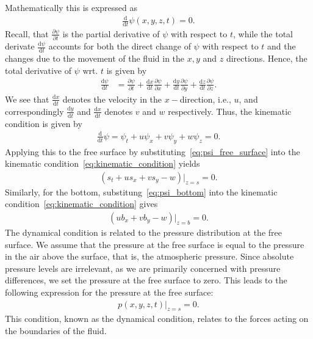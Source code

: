 Mathematically this is expressed as
\begin{align*}
    \frac{\text{d} }{\text{d} t} \psi(x,y,z,t) = 0.
\end{align*}
Recall, that $\frac{\partial \psi}{\partial t}$ is the partial derivative of $\psi$ with respect to $t$, while the total derivate $\frac{\text{d} \psi}{\text{d} t}$ accounts for both the direct change of $\psi$ with respect to $t$ and the changes due to the movement of the fluid in the $x, y$ and $z$ directions.
Hence, the total derivative of $\psi$ wrt. $t$ is given by
\begin{align*}
    \frac{\text{d} \psi}{\text{d} t} &= \frac{\partial \psi}{\partial t} + \frac{\text{d} x}{\text{d} t} \frac{\partial \psi}{\partial x} + \frac{\text{d} y}{\text{d} t}  \frac{\partial \psi}{\partial y} + \frac{\text{d} z}{\text{d} t}  \frac{\partial \psi}{\partial z}.
\end{align*}
We see that $\frac{\text{d}x}{\text{d}t}$ denotes the velocity in the $x-$direction, i.e., $u$, and correspondingly $\frac{\text{d}y}{\text{d}t}$ and $\frac{\text{d}x}{\text{d}t}$ denotes $v$ and $w$ respectively.
Thus, the kinematic condition is given by
\begin{align}\label{eq:kinematic_condition}
    \frac{\text{d} }{\text{d} t} \psi = \psi_t + u \psi_x + v \psi_y + w \psi_z = 0.
\end{align}
Applying this to the free surface by substituting~\eqref{eq:psi_free_surface} into the kinematic condition~\eqref{eq:kinematic_condition} yields
\begin{align}\label{eq:kinematic_condition_free_surface}
    (s_t + u s_x + v s_y - w)|_{z=s} = 0.
\end{align}
Similarly, for the bottom, substitung~\eqref{eq:psi_bottom} into the kinematic condition~\eqref{eq:kinematic_condition} gives
\begin{align}\label{eq:kinematic_condition_bottom}
    (u b_x + v b_y - w)|_{z=b} = 0.
\end{align}
The dynamical condition is related to the pressure distribution at the free surface.
We assume that the pressure at the free surface is equal to the pressure in the air above the surface, that is, the atmospheric pressure.
Since absolute pressure levels are irrelevant, as we are primarily concerned with pressure differences, we set the pressure at the free surface to zero.
This leads to the following expression for the pressure at the free surface:
\begin{align}\label{eq:pressure_free_surface}
    p(x,y,z,t)|_{z = s} = 0.
\end{align}
This condition, known as the dynamical condition, relates to the forces acting on the boundaries of the fluid.


